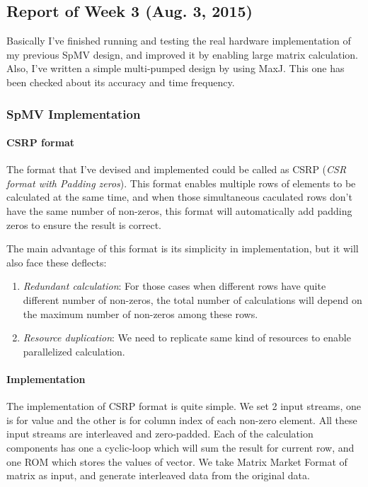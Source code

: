 \subsection{Report of Week 3 (Aug. 3, 2015)}

Basically I've finished running and testing the real hardware implementation of my previous SpMV design, and improved it by enabling large matrix calculation. Also, I've written a simple multi-pumped design by using MaxJ. This one has been checked about its accuracy and time frequency. 

\subsubsection{SpMV Implementation}

\paragraph{CSRP format} The format that I've devised and implemented could be called as CSRP (\textit{CSR format with Padding zeros}). This format enables multiple rows of elements to be calculated at the same time, and when those simultaneous caculated rows don't have the same number of non-zeros, this format will automatically add padding zeros to ensure the result is correct. 

The main advantage of this format is its simplicity in implementation, but it will also face these deflects:
\begin{enumerate}
\item \textit{Redundant calculation}: For those cases when different rows have quite different number of non-zeros, the total number of calculations will depend on the maximum number of non-zeros among these rows. 
\item \textit{Resource duplication}: We need to replicate same kind of resources to enable parallelized calculation. 
\end{enumerate}

\paragraph{Implementation} The implementation of CSRP format is quite simple. We set 2 input streams, one is for value and the other is for column index of each non-zero element. All these input streams are interleaved and zero-padded. Each of the calculation components has one a cyclic-loop which will sum the result for current row, and one ROM which stores the values of vector. We take Matrix Market Format of matrix as input, and generate interleaved data from the original data. 

